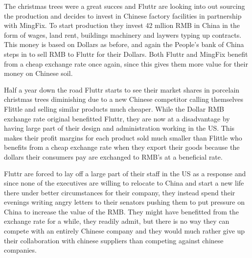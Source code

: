 \documentclass[11pt]{article}
\begin{document}
The christmas trees were a great succes and Fluttr are looking into out 
sourcing the production and decides to invest in Chinese factory 
facilities in partnership with MingFix. To start production they invest 
42 mllion RMB in China in the form of wages, land rent, buildings 
machinery and laywers typing up contracts.  This money is based on 
Dollars as before, and again the People's bank of China steps in to sell 
RMB to Fluttr for their Dollars.  Both Fluttr and MingFix benefit from a 
cheap exchange rate once again, since this gives them more value for 
their money on Chinese soil.

Half a year down the road Fluttr starts to see their market shares in 
porcelain christmas trees diminishing due to a new Chinese competitor 
calling themselves Flittle and selling similar products much 
cheaper.  While the Dollar RMB exchange rate original benefitted Fluttr, 
they are now at a disadvantage by having large part of their design and 
administration working in the US. This makes their profit margins for 
each product sold much smaller than Flittle who benefits from a cheap 
exchange rate when they export their goods because the dollars their 
consumers pay are exchanged to RMB's at a beneficial rate.

Fluttr are forced to lay off a large part of their staff in the US as a 
response and since none of the executives are willing to relocate to 
China and start a new life there under better circumstances for their 
company, they instead spend their evenings writing angry letters to 
their senators pushing them to put pressure on China to increase the 
value of the RMB. They might have benefitted from the exchange rate for 
a while, they readily admit, but there is no way they can compete with 
an entirely Chinese company and they would much rather give up their 
collaboration with chinese suppliers than competing against chinese 
companies.



\end{document}
